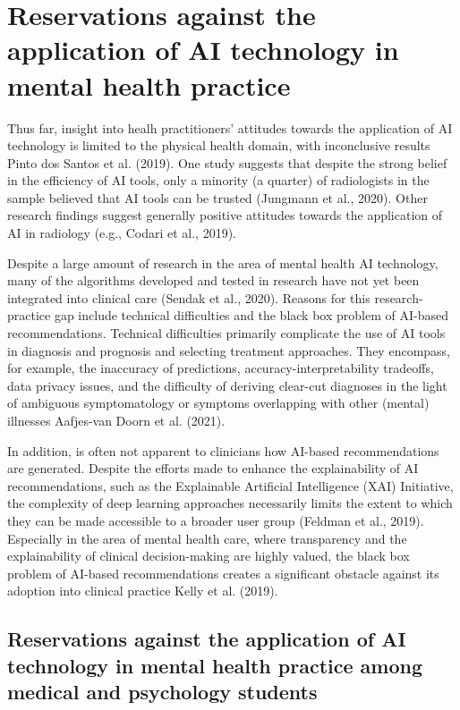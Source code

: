 \documentclass[
  man]{apa7}
\begin{document}
\hypertarget{reservations-against-the-application-of-ai-technology-in-mental-health-practice}{%
\section{Reservations against the application of AI technology in mental health practice}\label{reservations-against-the-application-of-ai-technology-in-mental-health-practice}}

Thus far, insight into healh practitioners' attitudes towards the application of AI technology is limited to the physical health domain, with inconclusive results Pinto dos Santos et al. (2019).
One study suggests that despite the strong belief in the efficiency of AI tools, only a minority (a quarter) of radiologists in the sample believed that AI tools can be trusted (Jungmann et al., 2020).
Other research findings suggest generally positive attitudes towards the application of AI in radiology (e.g., Codari et al., 2019).

Despite a large amount of research in the area of mental health AI technology, many of the algorithms developed and tested in research have not yet been integrated into clinical care (Sendak et al., 2020).
Reasons for this research-practice gap include technical difficulties and the black box problem of AI-based recommendations.
Technical difficulties primarily complicate the use of AI tools in diagnosis and prognosis and selecting treatment approaches. They encompass, for example, the inaccuracy of predictions, accuracy-interpretability tradeoffs, data privacy issues, and the difficulty of deriving clear-cut diagnoses in the light of ambiguous symptomatology or symptoms overlapping with other (mental) illnesses Aafjes-van Doorn et al. (2021).

In addition, is often not apparent to clinicians how AI-based recommendations are generated.
Despite the efforts made to enhance the explainability of AI recommendations, such as the Explainable Artificial Intelligence (XAI) Initiative, the complexity of deep learning approaches necessarily limits the extent to which they can be made accessible to a broader user group (Feldman et al., 2019).
Especially in the area of mental health care, where transparency and the explainability of clinical decision-making are highly valued, the black box problem of AI-based recommendations creates a significant obstacle against its adoption into clinical practice Kelly et al. (2019).

\hypertarget{reservations-against-the-application-of-ai-technology-in-mental-health-practice-among-medical-and-psychology-students}{%
\subsection{Reservations against the application of AI technology in mental health practice among medical and psychology students}\label{reservations-against-the-application-of-ai-technology-in-mental-health-practice-among-medical-and-psychology-students}}
\end{document}
